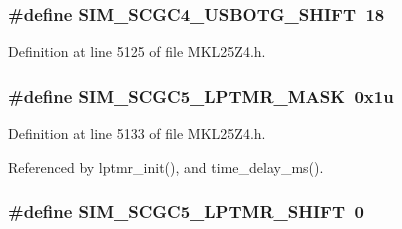 \subsubsection[{\texorpdfstring{S\+I\+M\+\_\+\+S\+C\+G\+C4\+\_\+\+U\+S\+B\+O\+T\+G\+\_\+\+S\+H\+I\+FT}{SIM_SCGC4_USBOTG_SHIFT}}]{\setlength{\rightskip}{0pt plus 5cm}\#define S\+I\+M\+\_\+\+S\+C\+G\+C4\+\_\+\+U\+S\+B\+O\+T\+G\+\_\+\+S\+H\+I\+FT~18}\hypertarget{group___s_i_m___register___masks_ga5d0dd9f68667fdf71fce1b0a6ae990dd}{}\label{group___s_i_m___register___masks_ga5d0dd9f68667fdf71fce1b0a6ae990dd}


Definition at line 5125 of file M\+K\+L25\+Z4.\+h.

\subsubsection[{\texorpdfstring{S\+I\+M\+\_\+\+S\+C\+G\+C5\+\_\+\+L\+P\+T\+M\+R\+\_\+\+M\+A\+SK}{SIM_SCGC5_LPTMR_MASK}}]{\setlength{\rightskip}{0pt plus 5cm}\#define S\+I\+M\+\_\+\+S\+C\+G\+C5\+\_\+\+L\+P\+T\+M\+R\+\_\+\+M\+A\+SK~0x1u}\hypertarget{group___s_i_m___register___masks_ga6f63b73e0ad63163df381c795d583cc1}{}\label{group___s_i_m___register___masks_ga6f63b73e0ad63163df381c795d583cc1}


Definition at line 5133 of file M\+K\+L25\+Z4.\+h.



Referenced by lptmr\+\_\+init(), and time\+\_\+delay\+\_\+ms().

\subsubsection[{\texorpdfstring{S\+I\+M\+\_\+\+S\+C\+G\+C5\+\_\+\+L\+P\+T\+M\+R\+\_\+\+S\+H\+I\+FT}{SIM_SCGC5_LPTMR_SHIFT}}]{\setlength{\rightskip}{0pt plus 5cm}\#define S\+I\+M\+\_\+\+S\+C\+G\+C5\+\_\+\+L\+P\+T\+M\+R\+\_\+\+S\+H\+I\+FT~0}\hypertarget{group___s_i_m___register___masks_ga9b3669f3f4f380e18133785d6356c56c}{}\label{group___s_i_m___register___masks_ga9b3669f3f4f380e18133785d6356c56c}


